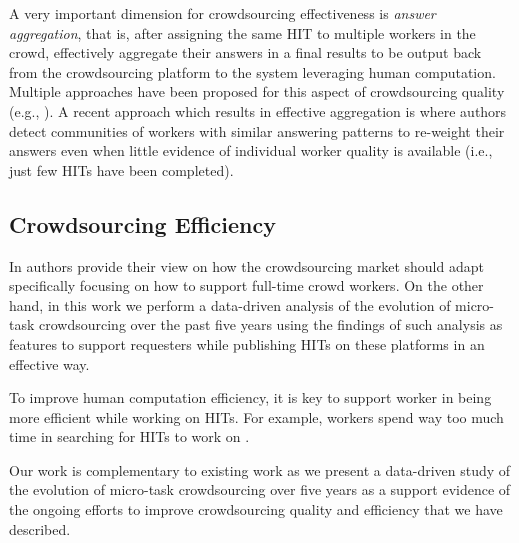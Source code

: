 A very important dimension for crowdsourcing effectiveness is \emph{answer aggregation}, that is, after assigning the same HIT to multiple workers in the crowd, effectively aggregate their answers in a final results to be output back from the crowdsourcing platform to the system leveraging human computation. Multiple approaches have been proposed for this aspect of crowdsourcing quality (e.g.,
\cite{Venanzi:2014:CBA:2566486.2567989,square,zencrowd,Hosseini:2012:ALM:2260641.2260661}).
% 
A recent approach which results in effective aggregation is \cite{Venanzi:2014:CBA:2566486.2567989} where authors detect communities of workers with similar answering patterns to re-weight their answers even when little evidence of individual worker quality is available (i.e., just few HITs have been completed).


\subsection{Crowdsourcing Efficiency}

In \cite{Kittur:2013:FCW:2441776.2441923} authors provide their view on how the crowdsourcing market should adapt specifically focusing on how to  support full-time crowd workers. On the other hand, in this work we perform a data-driven analysis of the evolution of micro-task crowdsourcing over the past five years using the findings of such analysis as features to support requesters while publishing HITs on these platforms in an effective way.



To improve human computation efficiency, it is key to support worker in being more efficient while working on HITs. For example, workers spend way too much time in searching for HITs to work on \cite{Kucherbaev:2014:TET:2598153.2602249}.






Our work is complementary to existing work as we present a data-driven study of the evolution of micro-task crowdsourcing over five years as a support evidence of the ongoing efforts to improve crowdsourcing quality and efficiency that we have described.